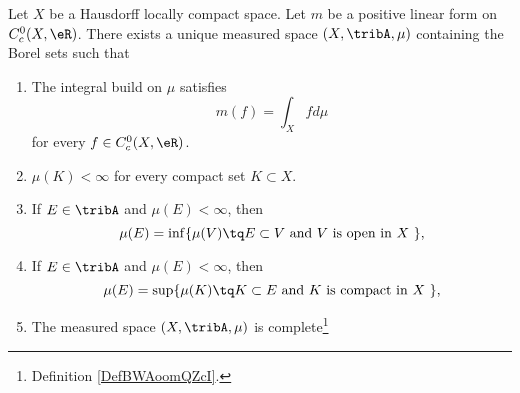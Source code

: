 \begin{theorem}      \label{THOooTWZWooHqGDAx}
    Let \( X\) be a Hausdorff locally compact space. Let \( m\) be a positive linear form on \( C^0_c(X, \eR)\). There exists a unique measured space \( (X,\tribA, \mu)\)  containing the Borel sets such that
    \begin{enumerate}
        \item       \label{ITEMooAKLQooWLetDk}
            The integral build on \( \mu\) satisfies
            \begin{equation}
                m(f)=\int_X fd\mu
            \end{equation}
            for every \( f\in C^0_c(X,\eR)\).
        \item       \label{ITEMooFLYHooTNUENu}
            \( \mu(K)<\infty\) for every compact set \( K\subset X\).
        \item       \label{ITEMooKDTLooJuUTaW}
            If \( E\in\tribA\) and \( \mu(E)<\infty\), then
            \begin{equation}
                \mu(E)=\inf\{ \mu(V)\tq E\subset V \text{ and \( V\) is open in \( X\) }\},
            \end{equation}
        \item       \label{ITEMooVKDEooXGJYgg}
            If \( E\in\tribA\) and \( \mu(E)<\infty\), then
            \begin{equation}
                \mu(E)=\sup\{ \mu(K)\tq K\subset E \text{ and \( K\) is compact in \( X\) }\},
            \end{equation}
        \item       \label{ITEMooLOQQooFcHyaM}
            The measured space \( (X,\tribA,\mu)\) is complete\footnote{Definition \ref{DefBWAoomQZcI}.}
    \end{enumerate}
\end{theorem}

